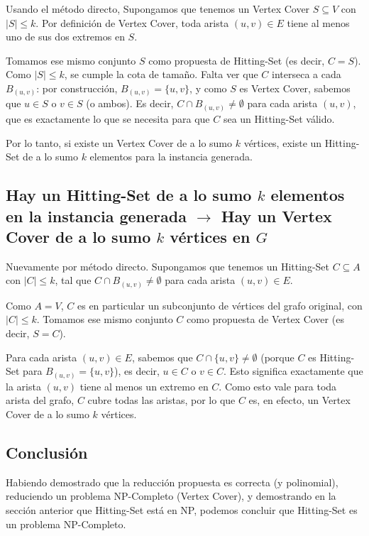 Usando el método directo, Supongamos que tenemos un Vertex Cover $S \subseteq V$ con $|S| \leq k$. Por definición de Vertex
Cover, toda arista $(u, v) \in E$ tiene al menos uno de sus dos extremos en $S$.

Tomamos ese mismo conjunto $S$ como propuesta de Hitting-Set (es decir, $C = S$). Como $|S| \leq k$, se cumple la cota de
tamaño. Falta ver que $C$ interseca a cada $B_{(u,v)}$: por construcción, $B_{(u,v)} = \{u, v\}$, y como $S$ es Vertex Cover,
sabemos que $u \in S$ o $v \in S$ (o ambos). Es decir, $C \cap B_{(u,v)} \neq \emptyset$ para cada arista $(u,v)$, que es
exactamente lo que se necesita para que $C$ sea un Hitting-Set válido.

Por lo tanto, si existe un Vertex Cover de a lo sumo $k$ vértices, existe un Hitting-Set de a lo sumo $k$ elementos para la
instancia generada.

\subsection*{Hay un Hitting-Set de a lo sumo $k$ elementos en la instancia generada $\rightarrow$ Hay un Vertex Cover de a lo
sumo $k$ vértices en $G$}

Nuevamente por método directo. Supongamos que tenemos un Hitting-Set $C \subseteq A$ con $|C| \leq k$, tal que
$C \cap B_{(u,v)} \neq \emptyset$ para cada arista $(u,v) \in E$.

Como $A = V$, $C$ es en particular un subconjunto de vértices del grafo original, con $|C| \leq k$. Tomamos ese mismo
conjunto $C$ como propuesta de Vertex Cover (es decir, $S = C$).

Para cada arista $(u, v) \in E$, sabemos que $C \cap \{u, v\} \neq \emptyset$ (porque $C$ es Hitting-Set para
$B_{(u,v)} = \{u, v\}$), es decir, $u \in C$ o $v \in C$. Esto significa exactamente que la arista $(u,v)$ tiene al menos un
extremo en $C$. Como esto vale para toda arista del grafo, $C$ cubre todas las aristas, por lo que $C$ es, en efecto, un
Vertex Cover de a lo sumo $k$ vértices.

\subsection{Conclusión}

Habiendo demostrado que la reducción propuesta es correcta (y polinomial), reduciendo un problema NP-Completo (Vertex
Cover), y demostrando en la sección anterior que Hitting-Set está en NP, podemos concluir que Hitting-Set es un problema
NP-Completo.
